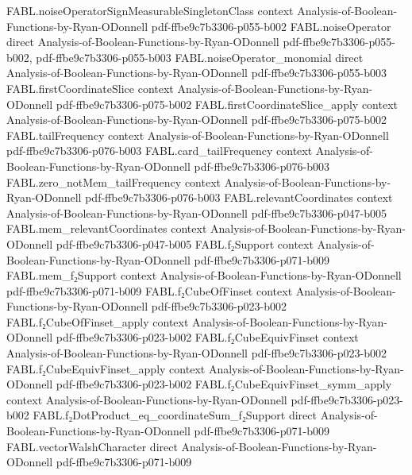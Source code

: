 \begin{theorem}
\proofstep
  {FABL.noiseOperatorSignMeasurableSingletonClass}
  {context}
  {Analysis-of-Boolean-Functions-by-Ryan-ODonnell}
  {pdf-ffbe9c7b3306-p055-b002}
\proofstep
  {FABL.noiseOperator}
  {direct}
  {Analysis-of-Boolean-Functions-by-Ryan-ODonnell}
  {pdf-ffbe9c7b3306-p055-b002,
    pdf-ffbe9c7b3306-p055-b003}
\proofstep
  {FABL.noiseOperator_monomial}
  {direct}
  {Analysis-of-Boolean-Functions-by-Ryan-ODonnell}
  {pdf-ffbe9c7b3306-p055-b003}
\proofstep
  {FABL.firstCoordinateSlice}
  {context}
  {Analysis-of-Boolean-Functions-by-Ryan-ODonnell}
  {pdf-ffbe9c7b3306-p075-b002}
\proofstep
  {FABL.firstCoordinateSlice_apply}
  {context}
  {Analysis-of-Boolean-Functions-by-Ryan-ODonnell}
  {pdf-ffbe9c7b3306-p075-b002}
\proofstep
  {FABL.tailFrequency}
  {context}
  {Analysis-of-Boolean-Functions-by-Ryan-ODonnell}
  {pdf-ffbe9c7b3306-p076-b003}
\proofstep
  {FABL.card_tailFrequency}
  {context}
  {Analysis-of-Boolean-Functions-by-Ryan-ODonnell}
  {pdf-ffbe9c7b3306-p076-b003}
\proofstep
  {FABL.zero_notMem_tailFrequency}
  {context}
  {Analysis-of-Boolean-Functions-by-Ryan-ODonnell}
  {pdf-ffbe9c7b3306-p076-b003}
\proofstep
  {FABL.relevantCoordinates}
  {context}
  {Analysis-of-Boolean-Functions-by-Ryan-ODonnell}
  {pdf-ffbe9c7b3306-p047-b005}
\proofstep
  {FABL.mem_relevantCoordinates}
  {context}
  {Analysis-of-Boolean-Functions-by-Ryan-ODonnell}
  {pdf-ffbe9c7b3306-p047-b005}
\proofstep
  {FABL.f₂Support}
  {context}
  {Analysis-of-Boolean-Functions-by-Ryan-ODonnell}
  {pdf-ffbe9c7b3306-p071-b009}
\proofstep
  {FABL.mem_f₂Support}
  {context}
  {Analysis-of-Boolean-Functions-by-Ryan-ODonnell}
  {pdf-ffbe9c7b3306-p071-b009}
\proofstep
  {FABL.f₂CubeOfFinset}
  {context}
  {Analysis-of-Boolean-Functions-by-Ryan-ODonnell}
  {pdf-ffbe9c7b3306-p023-b002}
\proofstep
  {FABL.f₂CubeOfFinset_apply}
  {context}
  {Analysis-of-Boolean-Functions-by-Ryan-ODonnell}
  {pdf-ffbe9c7b3306-p023-b002}
\proofstep
  {FABL.f₂CubeEquivFinset}
  {context}
  {Analysis-of-Boolean-Functions-by-Ryan-ODonnell}
  {pdf-ffbe9c7b3306-p023-b002}
\proofstep
  {FABL.f₂CubeEquivFinset_apply}
  {context}
  {Analysis-of-Boolean-Functions-by-Ryan-ODonnell}
  {pdf-ffbe9c7b3306-p023-b002}
\proofstep
  {FABL.f₂CubeEquivFinset_symm_apply}
  {context}
  {Analysis-of-Boolean-Functions-by-Ryan-ODonnell}
  {pdf-ffbe9c7b3306-p023-b002}
\proofstep
  {FABL.f₂DotProduct_eq_coordinateSum_f₂Support}
  {direct}
  {Analysis-of-Boolean-Functions-by-Ryan-ODonnell}
  {pdf-ffbe9c7b3306-p071-b009}
\proofstep
  {FABL.vectorWalshCharacter}
  {direct}
  {Analysis-of-Boolean-Functions-by-Ryan-ODonnell}
  {pdf-ffbe9c7b3306-p071-b009}

\end{theorem}
